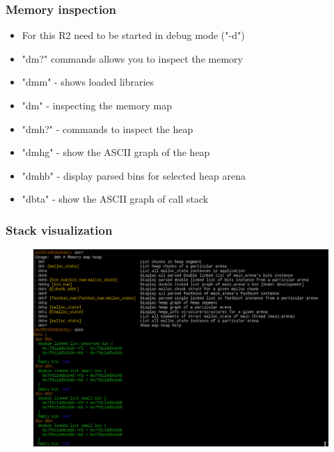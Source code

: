 \documentclass[10pt,pdf,utf8,english,compress,hyperref={unicode}]{beamer}
\begin{document}
\begin{frame}[fragile]
  \frametitle{Memory inspection}
  \begin{itemize}
	  \item For this R2 need to be started in debug mode ("-d")
	  \item "dm?" commands allows you to inspect the memory
	  \item "dmm" - shows loaded libraries
	  \item "dm" - inspecting the memory map
	  \item "dmh?" - commands to inspect the heap
	  \item "dmhg" - show the ASCII graph of the heap
	  \item "dmhb" - display parsed bins for selected heap arena
	  \item "dbta" - show the ASCII graph of call stack
  \end{itemize}
\end{frame}

\begin{frame}[fragile]
	\frametitle{Stack visualization}
	\begin{figure}
		\includegraphics[width=\linewidth]{r2heapbins.png}
	\end{figure}
\end{frame}
\end{document}
